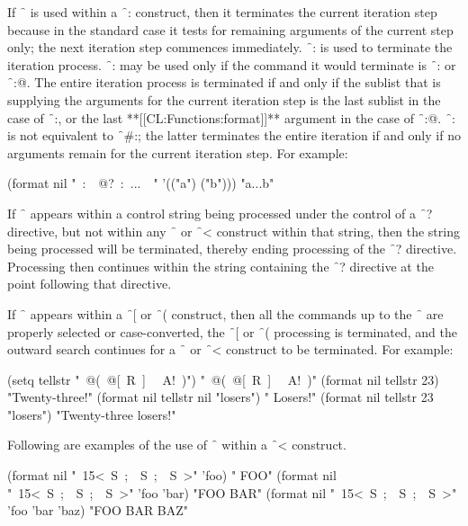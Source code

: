 If \f{~{\hat}} is used within a \f{~:\lbr  } 
construct, then it terminates
the current iteration step because in the standard case it tests for
remaining arguments of the current step only; the next iteration step
commences immediately.  \f{~:{\hat}} is used to terminate
the iteration process.
\f{~:{\hat}} 
may be used only if the command it would terminate is 
\f{~:\lbr  } or \f{~:@\lbr  }.
The entire iteration process is terminated if and only if the sublist that is
supplying the arguments for the current iteration step is the last sublist in
the case of \f{~:\lbr }, 
or the last **[[CL:Functions:format]]**        
argument in the case of \f{~:@\lbr  }. 
\f{~:{\hat}} is not
equivalent to \f{~\#:{\hat}}; 
the latter terminates the entire iteration if and only if no
arguments remain for the current iteration step.
For example:

\code
 (format nil "~:\lbr\ ~@?~:\hat\ ...~\rbr\ " '(("a") ("b"))) \EV "a...b"
\endcode



If \f{~{\hat}} appears within a control string being processed
under the control of a \f{~?} directive, but not within
any \f{~\lbr  } or \f{~<} construct within that string,
then the string being
processed will be terminated, thereby ending processing
of the \f{~?} directive.  Processing then
continues within the string   
containing the \f{~?} directive at the point following that directive.


If \f{~{\hat}}                                          
appears within a \f{~[} or \f{~(} construct,
then all the commands up to the \f{~{\hat}} are properly selected
or case-converted,                   
the \f{~[} or \f{~(} processing is terminated,
and the outward search continues         
for a \f{~\lbr  } or \f{~<} construct
to be terminated.  For example:
                            
\code
 (setq tellstr "~@(~@[~R~]~{\hat} ~A!~)")
\EV "~@(~@[~R~]~{\hat} ~A!~)"
 (format nil tellstr 23) \EV "Twenty-three!"
 (format nil tellstr nil "losers") \EV " Losers!"
 (format nil tellstr 23 "losers") \EV "Twenty-three losers!"
\endcode


Following are examples of the use of \f{~{\hat}} 
within a \f{~<} construct.

\code
 (format nil "~15<~S~;~{\hat}~S~;~{\hat}~S~>" 'foo)
\EV  "            FOO"
 (format nil "~15<~S~;~{\hat}~S~;~{\hat}~S~>" 'foo 'bar)
\EV  "FOO         BAR"
 (format nil "~15<~S~;~{\hat}~S~;~{\hat}~S~>" 'foo 'bar 'baz)
\EV  "FOO   BAR   BAZ"
\endcode

